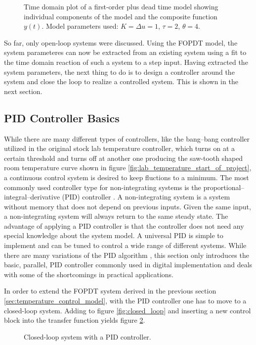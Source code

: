 \begin{figure}[ht]
    \centering
    
    \caption{Time domain plot of a first-order plus dead time model showing individual components of the model and the composite function $y(t)$. Model parameters used: $K= \Delta u = 1$, $\tau=2$, $\theta=4$.}
    \label{fig:fopdt}
\end{figure}

So far, only open-loop systems were discussed. Using the FOPDT model, the system parameteres can now be extracted from an existing system using a fit to the time domain reaction of such a system to a step input. Having extracted the system parameters, the next thing to do is to design a controller around the system and close the loop to realize a controlled system. This is shown in the next section.

\clearpage
\subsection{PID Controller Basics}
While there are many different types of controllers, like the bang–bang controller utilized in the original stock lab temperature controller, which turns on at a certain threshold and turns off at another one producing the saw-tooth shaped room temperature curve shown in figure \ref{fig:lab_temperature_start_of_project}, a continuous control system is desired to keep fluctions to a minimum. The most commonly used controller type for non-integrating systems is the proportional–integral–derivative (PID) controller \cite{pid_in_industry}. A non-integrating system is a system without memory that does not depend on previous inputs. Given the same input, a non-integrating system will always return to the same steady state. The advantage of applying a PID controller is that the controller does not need any special knowledge about the system model. A universal PID is simple to implement and can be tuned to control a wide range of different systems. While there are many variations of the PID algorithm \cite{pid_controller}, this section only introduces the basic, parallel, PID controller commonly used in digital implementation and deals with some of the shortcomings in practical applications.

In order to extend the FOPDT system derived in the previous section \ref{sec:temperature_control_model}, with the PID controller one has to move to a closed-loop system. Adding to figure \ref{fig:closed_loop} and inserting a new control block into the transfer function yields figure \ref{fig:closed_loop_pid}.
\begin{figure}[ht]
    \centering
    \caption{Closed-loop system with a PID controller.}
    \label{fig:closed_loop_pid}
\end{figure}

